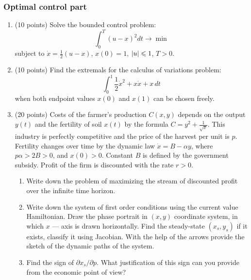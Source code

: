 \documentclass[12pt, a4paper]{article}
\DeclarePairedDelimiter{\abs}{\lvert}{\rvert}
\begin{document}


\subsubsection*{Optimal control part}

\begin{enumerate}[resume]

\item (10 points) Solve the bounded control problem:
\[
\int_0^T {{{(u - x)}^2}dt \to \min }
\]
subject to $\dot x = \frac{1}{2}(u - x)$, $x(0) = 1$, $\abs{u} \leq  1$, $T > 0$.

\item (10 points) Find the extremals for the calculus of variations problem:
\[
\int_0^1 \frac{1}{2}{{\dot x}^2} + x\dot x + x \, dt
\]
when both endpoint values $x(0)$ and $x(1)$ can be chosen freely.


\item (20 points) Costs of the farmer's production $C(x,y)$ depends on the output $y(t)$ and the fertility of soil $x(t)$ by the formula $C = {y^2} + \frac{1}{{\sqrt x }}$. This industry is perfectly competitive and the price of the harvest per unit is $p$. Fertility changes over time by the dynamic law $\dot x = B - \alpha y$, where $p\alpha  > 2B > 0$, and $x(0) > 0$. Constant $B$ is defined by the government subsidy. Profit of the firm is discounted with the rate $r > 0$.

\begin{enumerate}
\item Write down the problem of maximizing the stream of discounted profit over the infinite time horizon.
\item Write down the system of first order conditions using the current value Hamiltonian.  Draw the phase portrait in $(x,y)$ coordinate system, in which $x$ — axis is drawn horizontally. Find the steady-state $(x_s, y_s)$ if it exists, classify it using Jacobian. With the help of the arrows provide the sketch of the dynamic paths of the system.
\item Find the sign of $\partial x_s / \partial p$. What justification of this sign can you provide from the economic point of view?
\end{enumerate}



\end{enumerate}
\end{document}
